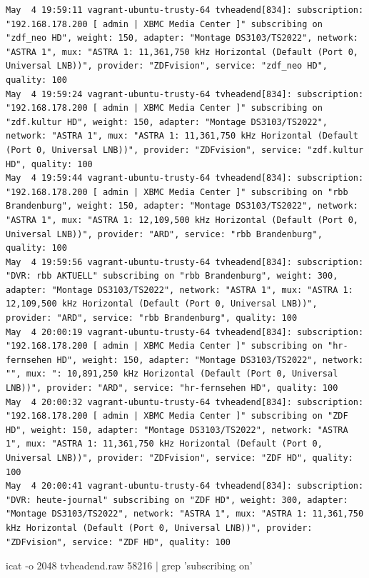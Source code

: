\begin{cmd}[H]
\begin{Verbatim}[fontsize=\tiny]
May  4 19:59:11 vagrant-ubuntu-trusty-64 tvheadend[834]: subscription: "192.168.178.200 [ admin | XBMC Media Center ]" subscribing on "zdf_neo HD", weight: 150, adapter: "Montage DS3103/TS2022", network: "ASTRA 1", mux: "ASTRA 1: 11,361,750 kHz Horizontal (Default (Port 0, Universal LNB))", provider: "ZDFvision", service: "zdf_neo HD", quality: 100
May  4 19:59:24 vagrant-ubuntu-trusty-64 tvheadend[834]: subscription: "192.168.178.200 [ admin | XBMC Media Center ]" subscribing on "zdf.kultur HD", weight: 150, adapter: "Montage DS3103/TS2022", network: "ASTRA 1", mux: "ASTRA 1: 11,361,750 kHz Horizontal (Default (Port 0, Universal LNB))", provider: "ZDFvision", service: "zdf.kultur HD", quality: 100
May  4 19:59:44 vagrant-ubuntu-trusty-64 tvheadend[834]: subscription: "192.168.178.200 [ admin | XBMC Media Center ]" subscribing on "rbb Brandenburg", weight: 150, adapter: "Montage DS3103/TS2022", network: "ASTRA 1", mux: "ASTRA 1: 12,109,500 kHz Horizontal (Default (Port 0, Universal LNB))", provider: "ARD", service: "rbb Brandenburg", quality: 100
May  4 19:59:56 vagrant-ubuntu-trusty-64 tvheadend[834]: subscription: "DVR: rbb AKTUELL" subscribing on "rbb Brandenburg", weight: 300, adapter: "Montage DS3103/TS2022", network: "ASTRA 1", mux: "ASTRA 1: 12,109,500 kHz Horizontal (Default (Port 0, Universal LNB))", provider: "ARD", service: "rbb Brandenburg", quality: 100
May  4 20:00:19 vagrant-ubuntu-trusty-64 tvheadend[834]: subscription: "192.168.178.200 [ admin | XBMC Media Center ]" subscribing on "hr-fernsehen HD", weight: 150, adapter: "Montage DS3103/TS2022", network: "", mux: ": 10,891,250 kHz Horizontal (Default (Port 0, Universal LNB))", provider: "ARD", service: "hr-fernsehen HD", quality: 100
May  4 20:00:32 vagrant-ubuntu-trusty-64 tvheadend[834]: subscription: "192.168.178.200 [ admin | XBMC Media Center ]" subscribing on "ZDF HD", weight: 150, adapter: "Montage DS3103/TS2022", network: "ASTRA 1", mux: "ASTRA 1: 11,361,750 kHz Horizontal (Default (Port 0, Universal LNB))", provider: "ZDFvision", service: "ZDF HD", quality: 100
May  4 20:00:41 vagrant-ubuntu-trusty-64 tvheadend[834]: subscription: "DVR: heute-journal" subscribing on "ZDF HD", weight: 300, adapter: "Montage DS3103/TS2022", network: "ASTRA 1", mux: "ASTRA 1: 11,361,750 kHz Horizontal (Default (Port 0, Universal LNB))", provider: "ZDFvision", service: "ZDF HD", quality: 100
\end{Verbatim}
\caption{icat -o 2048 tvheadend.raw 58216 | grep 'subscribing on'}
\label{cmd:tvheadend-subscription}
\end{cmd}


